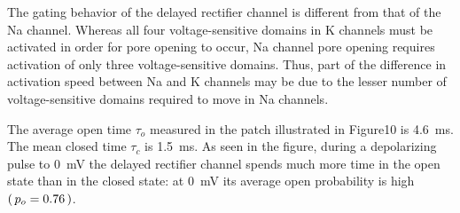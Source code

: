 \documentclass[class={myRUCProject}, crop=false]{standalone}
\begin{document}
The gating behavior of the delayed rectifier channel is different from that of the \gls{Na} channel. Whereas all four voltage-sensitive domains in \gls{K} channels must be activated in order for pore opening to occur, \gls{Na} channel pore opening requires activation of only three voltage-sensitive domains. Thus, part of the difference in activation speed between \gls{Na} and \gls{K} channels may be due to the lesser number of voltage-sensitive domains required to move in \gls{Na} channels.

The average open time \(\tau_o\) measured in the patch illustrated in Figure10 is \qty{4.6}{\ms}. The mean closed time \(\tau_c\) is \qty{1.5}{\ms}. As seen in the figure, during a depolarizing pulse to \qty{0}{\mV} the delayed rectifier channel spends much more time in the open state than in the closed state: at \qty{0}{\mV} its average open probability is high \(\left(\,p_o = 0.76\,\right)\).
\end{document}
